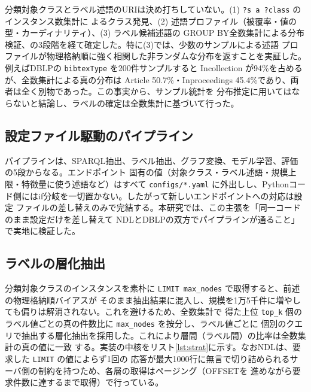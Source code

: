 \documentclass[dvipdfmx,twoside,11pt]{article}
\begin{document}
分類対象クラスとラベル述語のURIは決め打ちしていない。(1) \texttt{?s a ?class} のインスタンス数集計に
よるクラス発見、(2) 述語プロファイル（被覆率・値の型・カーディナリティ）、(3) ラベル候補述語の
GROUP BY全数集計による分布検証、の3段階を経て確定した。特に(3)では、少数のサンプルによる述語
プロファイルが物理格納順に強く相関した非ランダムな分布を返すことを実証した。例えばDBLPの
\texttt{bibtexType} を200件サンプルすると Incollection が94\%を占めるが、全数集計による真の分布は
Article 50.7\%・Inproceedings 45.4\%であり、両者は全く別物であった。この事実から、サンプル統計を
分布推定に用いてはならないと結論し、ラベルの確定は全数集計に基づいて行った。

\subsection{設定ファイル駆動のパイプライン}

パイプラインは、SPARQL抽出、ラベル抽出、グラフ変換、モデル学習、評価の5段からなる。エンドポイント
固有の値（対象クラス・ラベル述語・規模上限・特徴量に使う述語など）はすべて \texttt{configs/*.yaml}
に外出しし、Pythonコード側にはif分岐を一切置かない。したがって新しいエンドポイントへの対応は設定
ファイルの差し替えのみで完結する。本研究では、この主張を「同一コードのまま設定だけを差し替えて
NDLとDBLPの双方でパイプラインが通ること」で実地に検証した。

\subsection{ラベルの層化抽出}

分類対象クラスのインスタンスを素朴に \texttt{LIMIT max\_nodes} で取得すると、前述の物理格納順バイアスが
そのまま抽出結果に混入し、規模を1万5千件に増やしても偏りは解消されない。これを避けるため、全数集計で
得た上位 \texttt{top\_k} 個のラベル値ごとの真の件数比に \texttt{max\_nodes} を按分し、ラベル値ごとに
個別のクエリで抽出する層化抽出を採用した。これにより層間（ラベル間）の比率は全数集計の真の値に一致
する。実装の中核をリスト\ref{lst:strat}に示す。なおNDLは、要求した \texttt{LIMIT} の値によらず1回の
応答が最大1000行に無言で切り詰められるサーバ側の制約を持つため、各層の取得はページング（OFFSETを
進めながら要求件数に達するまで取得）で行っている。
\end{document}
